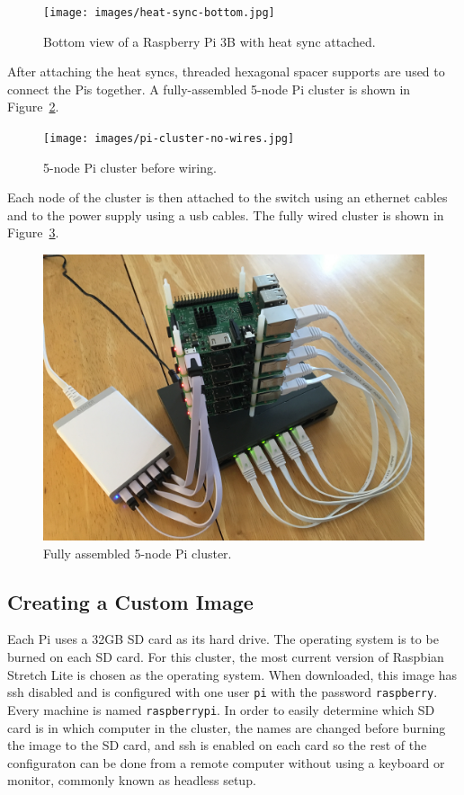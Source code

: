 \begin{figure}[!ht]
  \centering\texttt{[image: images/heat-sync-bottom.jpg]} \caption{Bottom
  view of a Raspberry Pi 3B with heat sync
  attached.}\label{f:heat-sync-bottom}
\end{figure}

After attaching the heat syncs, threaded hexagonal spacer supports are
used to connect the Pis together. A fully-assembled 5-node Pi cluster
is shown in Figure~\ref{f:cluster-no-wires}.

\begin{figure}[!ht]
  \centering\texttt{[image: images/pi-cluster-no-wires.jpg]}
  \caption{5-node Pi cluster before wiring.}\label{f:cluster-no-wires}
\end{figure}

Each node of the cluster is then attached to the switch using an
ethernet cables and to the power supply using a usb cables. The fully
wired cluster is shown in Figure~\ref{f:complete-cluster}.

\begin{figure}[!ht]
  \centering\includegraphics[width=\columnwidth]{images/complete-pi-cluster.jpg}
  \caption{Fully assembled 5-node Pi cluster.}\label{f:complete-cluster}
\end{figure}

\subsection{Creating a Custom Image}
Each Pi uses a 32GB SD card as its hard drive. The operating system is
to be burned on each SD card. For this cluster, the most current
version of Raspbian Stretch Lite is chosen as the operating
system. When downloaded, this image has ssh disabled and is configured
with one user \verb|pi| with the password \verb|raspberry|. Every
machine is named \verb|raspberrypi|. In order to easily determine
which SD card is in which computer in the cluster, the names are
changed before burning the image to the SD card, and ssh is enabled on
each card so the rest of the configuraton can be done from a remote
computer without using a keyboard or monitor, commonly known as
headless setup.

